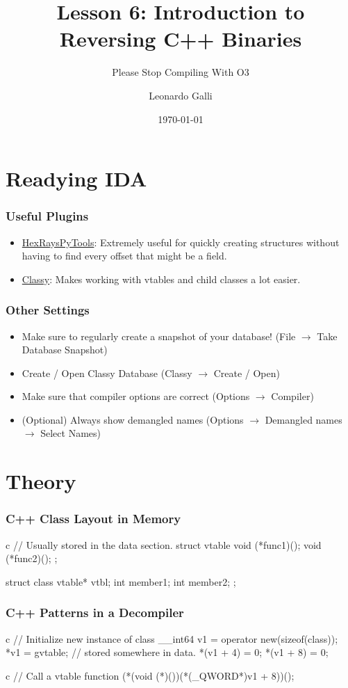 \documentclass[aspectratio=169]{beamer}
\title{Lesson 6: Introduction to Reversing C++ Binaries}
\subtitle{Please Stop Compiling With O3}
\author{Leonardo Galli}
\date{\today}
\begin{document}
 
\titleframe

\tocframe
\section{Readying IDA}
\begin{frame}
	\frametitle{Useful Plugins}
	\begin{itemize}
		\item \href{https://github.com/igogo-x86/HexRaysPyTools}{HexRaysPyTools}: Extremely useful for quickly creating structures without having to find every offset that might be a field.
		\item \href{https://github.com/RicBent/Classy}{Classy}: Makes working with vtables and child classes a lot easier.
	\end{itemize}
\end{frame}
\begin{frame}
	\frametitle{Other Settings}
	\begin{itemize}
		\item Make sure to regularly create a snapshot of your database! (File $\to$ Take Database Snapshot)
		\item Create / Open Classy Database (Classy $\to$ Create / Open)
		\item Make sure that compiler options are correct (Options $\to$ Compiler)
		\item (Optional) Always show demangled names (Options $\to$ Demangled names $\to$ Select Names)
	\end{itemize}
\end{frame}

\section{Theory}
\begin{frame}[fragile]
	\frametitle{C++ Class Layout in Memory}

\begin{codebox}{c}
// Usually stored in the data section.
struct vtable {
	void (*func1)();
	void (*func2)();
};

struct class {
	vtable* vtbl;
	int member1;
	int member2;
};
\end{codebox}

\end{frame}


\begin{frame}[fragile]
	\frametitle{C++ Patterns in a Decompiler}
\begin{codebox}{c}
// Initialize new instance of class
__int64 v1 = operator new(sizeof(class));
*v1 = gvtable; // stored somewhere in data.
*(v1 + 4) = 0;
*(v1 + 8) = 0;
\end{codebox}
\begin{codebox}{c}
// Call a vtable function
(*(void (*)())(*(_QWORD*)v1 + 8))();
\end{codebox}

\end{frame}
\end{document}
